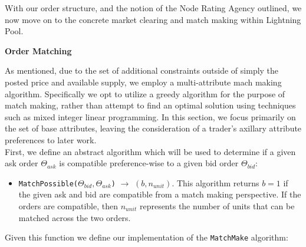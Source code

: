\documentclass[10pt,a4paper]{article}
\theoremstyle{definition}
\begin{document}
With our order structure, and the notion of the Node Rating Agency outlined, we
now move on to the concrete market clearing and match making within Lightning
Pool.

\begin{center}
    \textbf{Order Matching}
\end{center}

As mentioned, due to the set of additional constraints outside of simply the
posted price and available supply, we employ a multi-attribute mach making
algorithm. Specifically we opt to utilize a greedy algorithm for the purpose of
match making, rather than attempt to find an optimal solution using
techniques such as mixed integer linear programming. In this section, we focus
primarily on the set of base attributes, leaving the consideration of a
trader's axillary attribute preferences to later work. \\


First, we define an abstract algorithm which will be used to determine if a
given ask order $\Theta_{ask}$ is compatible preference-wise to a given bid
order $\Theta_{bid}$:
\begin{itemize}
    \item \texttt{MatchPossible($\Theta_{bid}, \Theta_{ask}$)} $\rightarrow$
        $(b, n_{unit})$. This algorithm returns $b=1$ if the given ask and bid
        are compatible from a match making perspective. If the orders are
        compatible, then $n_{unit}$ represents the number of units that can be
        matched across the two orders.
\end{itemize}


Given this function we define our implementation of the \texttt{MatchMake}
algorithm:
\begin{pchstack}[boxed,center, space=1em]
\end{pchstack}
\end{document}
